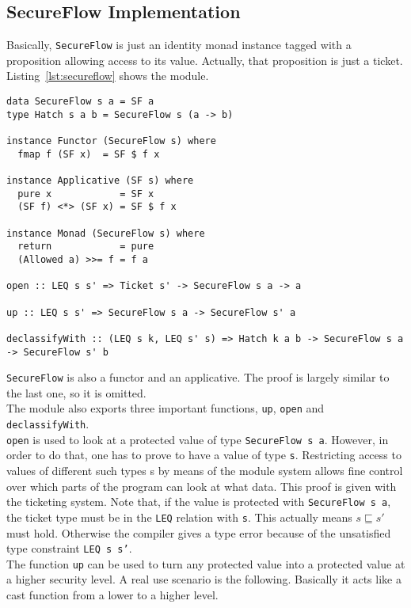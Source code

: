 \subsection{SecureFlow Implementation}
Basically, \texttt{SecureFlow} is just an identity monad instance tagged with a proposition allowing access to its value. Actually, that proposition is just a ticket. Listing~\ref{lst:secureflow} shows the module.
\begin{lstlisting}[caption={SecureFlow monad}, label={lst:secureflow}, breaklines=true]
data SecureFlow s a = SF a
type Hatch s a b = SecureFlow s (a -> b)

instance Functor (SecureFlow s) where
  fmap f (SF x)  = SF $ f x

instance Applicative (SF s) where
  pure x            = SF x
  (SF f) <*> (SF x) = SF $ f x

instance Monad (SecureFlow s) where
  return            = pure
  (Allowed a) >>= f = f a
  
open :: LEQ s s' => Ticket s' -> SecureFlow s a -> a

up :: LEQ s s' => SecureFlow s a -> SecureFlow s' a

declassifyWith :: (LEQ s k, LEQ s' s) => Hatch k a b -> SecureFlow s a -> SecureFlow s' b
\end{lstlisting}
%
%

\texttt{SecureFlow} is also a functor and an applicative. The proof is largely similar to the last one, so it is omitted. \\
The module also exports three important functions, \texttt{up}, \texttt{open} and \texttt{declassifyWith}. \\
\texttt{open} is used to look at a protected value of type \texttt{SecureFlow s a}. However, in order to do that, one has to prove to have a value of type \texttt{s}. Restricting access to values of different such types s by means of the module system allows fine control over which parts of the program can look at what data. This proof is given with the ticketing system. Note that, if the value is protected with \texttt{SecureFlow s a}, the ticket type must be in the \texttt{LEQ} relation with \texttt{s}. This actually means $s \sqsubseteq s'$ must hold. Otherwise the compiler gives a type error because of the unsatisfied type constraint \texttt{LEQ s s'}. \\
The function \texttt{up} can be used to turn any protected value into a protected value at a higher security level. A real use scenario is the following. Basically it acts like a cast function from a lower to a higher level. 
